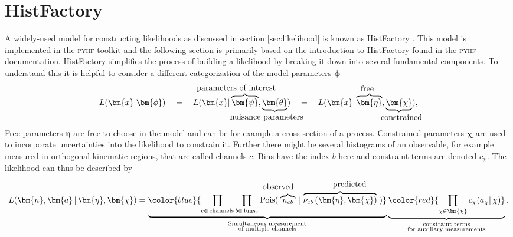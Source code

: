 \section{HistFactory}\label{sec:histfactory_model}
A widely-used model for constructing likelihoods as discussed in section \ref{sec:likelihood} is known as HistFactory \citep{cranmer2012histfactory}. This model is implemented in the \textsc{pyhf} toolkit \citep{pyhf} and the following section is primarily based on the introduction to HistFactory found in the \textsc{pyhf} documentation. HistFactory simplifies the process of building a likelihood by breaking it down into several fundamental components. To understand this it is helpful to consider a different categorization of the model parameters $\bm{\phi}$
\newcommand{\freeset}{\bm{\eta}}
\newcommand{\constrset}{\bm{\chi}}
\newcommand{\singleconstr}{\chi}
\newcommand{\channelcounts}{\bm{n}}
\newcommand{\auxdata}{\bm{a}}
\newcommand{\poiset}{\bm{\psi}}
\newcommand{\nuisset}{\bm{\theta}}
\newcommand{\fullset}{\bm{\phi}}
\newcommand{\singlefull}{\phi}
\begin{equation}
    L(\bm{x}|\fullset) \quad=\quad
    L(\bm{x}|\overbrace{\poiset}^{\llap{\text{parameters of interest}}},\underbrace{\nuisset}_{\llap{\text{nuisance parameters}}}) \quad=\quad
    L(\bm{x}|\overbrace{\freeset}^{\rlap{\text{free}}},\underbrace{\constrset}_{\rlap{\text{constrained}}}),
\end{equation}
Free parameters $\freeset$ are free to choose in the model and can be for example a cross-section of a process. Constrained parameters $\constrset$ are used to incorporate uncertainties into the likelihood to constrain it. Further there might be several histograms of an observable, for example measured in orthogonal kinematic regions, that are called channels $c$. Bins have the index $b$ here and constraint terms are denoted $c_{\singleconstr}$. The likelihood can thus be described by
\begin{equation}
    L(\channelcounts, \auxdata \,|\,\freeset,\constrset)
    = \underbrace{\color{blue}{\prod_{c\in\mathrm{\,channels}} \prod_{b \in \mathrm{\,bins}_c}
            \textrm{Pois} ( 
                \;\overbrace{n_{cb}}^{\llap{\text{\strut observed}\quad\;}}
            \,|\, \overbrace{\nu_{cb}\left(\freeset,\constrset\right)}^{\llap{\quad\text{\strut predicted}}}
            \;)}}_{\substack{\text{Simultaneous measurement}\\%
            \text{of multiple channels}}}
    \underbrace{\color{red}{\prod_{\singleconstr \in \constrset} c_{\singleconstr}(a_{\singleconstr} |\, \singleconstr)}}_{\substack{\text{constraint terms}\\%
            \text{for }\text{auxiliary measurements}}}.
            \label{eq:histfactory_likelihood}
\end{equation}
